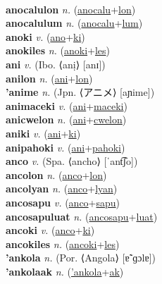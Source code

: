  \label{anocalu} \\
\textbf{anocalulon} \textit{n.} (\hyperref[anocalu]{anocalu}+\hyperref[lon]{lon})
 \label{anocalulon} \\
\textbf{anocalulum} \textit{n.} (\hyperref[anocalu]{anocalu}+\hyperref[lum]{lum})
 \label{anocalulum} \\
\textbf{anoki} \textit{v.} (\hyperref[ano]{ano}+\hyperref[ki]{ki})
 \label{anoki} \\
\textbf{anokiles} \textit{n.} (\hyperref[anoki]{anoki}+\hyperref[les]{les})
 \label{anokiles} \\
\textbf{ani} \textit{v.} (Ibo. ⟨anị⟩ [anɪ])
 \label{ani} \\
\textbf{anilon} \textit{n.} (\hyperref[ani]{ani}+\hyperref[lon]{lon})
 \label{anilon} \\
\textbf{'anime} \textit{n.} (Jpn. ⟨アニメ⟩ [aɲime])
 \label{'anime} \\
\textbf{animaceki} \textit{v.} (\hyperref[ani]{ani}+\hyperref[maceki]{maceki})
 \label{animaceki} \\
\textbf{anicwelon} \textit{n.} (\hyperref[ani]{ani}+\hyperref[cwelon]{cwelon})
 \label{anicwelon} \\
\textbf{aniki} \textit{v.} (\hyperref[ani]{ani}+\hyperref[ki]{ki})
 \label{aniki} \\
\textbf{anipahoki} \textit{v.} (\hyperref[ani]{ani}+\hyperref[pahoki]{pahoki})
 \label{anipahoki} \\
\textbf{anco} \textit{v.} (Spa. ⟨ancho⟩ [ˈant͡ʃo])
 \label{anco} \\
\textbf{ancolon} \textit{n.} (\hyperref[anco]{anco}+\hyperref[lon]{lon})
 \label{ancolon} \\
\textbf{ancolyan} \textit{n.} (\hyperref[anco]{anco}+\hyperref[lyan]{lyan})
 \label{ancolyan} \\
\textbf{ancosapu} \textit{v.} (\hyperref[anco]{anco}+\hyperref[sapu]{sapu})
 \label{ancosapu} \\
\textbf{ancosapuluat} \textit{n.} (\hyperref[ancosapu]{ancosapu}+\hyperref[luat]{luat})
 \label{ancosapuluat} \\
\textbf{ancoki} \textit{v.} (\hyperref[anco]{anco}+\hyperref[ki]{ki})
 \label{ancoki} \\
\textbf{ancokiles} \textit{n.} (\hyperref[ancoki]{ancoki}+\hyperref[les]{les})
 \label{ancokiles} \\
\textbf{'ankola} \textit{n.} (Por. ⟨Angola⟩ [ɐ̃ˈɡɔlɐ])
 \label{'ankola} \\
\textbf{'ankolaak} \textit{n.} (\hyperref['ankola]{'ankola}+\hyperref[ak]{ak})
